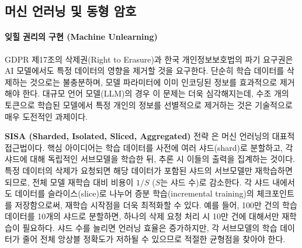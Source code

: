 \subsection{머신 언러닝 및 동형 암호}
\label{sec:15.2.3}

\paragraph{잊힐 권리의 구현 (Machine Unlearning)}
GDPR 제17조의 삭제권(Right to Erasure)과 한국 개인정보보호법의 파기 요구권은 AI 모델에서도 특정 데이터의 영향을 제거할 것을 요구한다. 단순히 학습 데이터를 삭제하는 것으로는 불충분하며, 모델 파라미터에 이미 인코딩된 정보를 효과적으로 제거해야 한다. 대규모 언어 모델(LLM)의 경우 이 문제는 더욱 심각해지는데, 수조 개의 토큰으로 학습된 모델에서 특정 개인의 정보를 선별적으로 제거하는 것은 기술적으로 매우 도전적인 과제이다.

\textbf{SISA (Sharded, Isolated, Sliced, Aggregated)} 전략 \cite{bourtoule2021unlearning}은 머신 언러닝의 대표적 접근법이다. 핵심 아이디어는 학습 데이터를 사전에 여러 샤드(shard)로 분할하고, 각 샤드에 대해 독립적인 서브모델을 학습한 뒤, 추론 시 이들의 출력을 집계하는 것이다. 특정 데이터의 삭제가 요청되면 해당 데이터가 포함된 샤드의 서브모델만 재학습하면 되므로, 전체 모델 재학습 대비 비용이 $1/S$ ($S$는 샤드 수)로 감소한다. 각 샤드 내에서도 데이터를 슬라이스(slice)로 나누어 증분 학습(incremental training)의 체크포인트를 저장함으로써, 재학습 시작점을 더욱 최적화할 수 있다. 예를 들어, 100만 건의 학습 데이터를 10개의 샤드로 분할하면, 하나의 삭제 요청 처리 시 10만 건에 대해서만 재학습이 필요하다. 샤드 수를 늘리면 언러닝 효율은 증가하지만, 각 서브모델의 학습 데이터가 줄어 전체 앙상블 정확도가 저하될 수 있으므로 적절한 균형점을 찾아야 한다.

